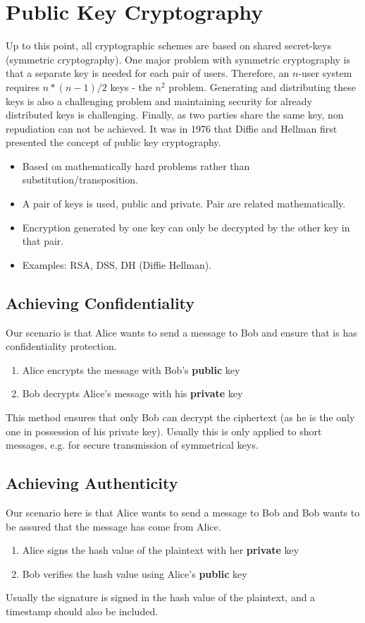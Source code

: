 \documentclass{article}
\begin{document}
\section{Public Key Cryptography}
Up to this point, all cryptographic schemes are based on shared secret-keys (symmetric cryptography). One major problem with symmetric cryptography is that a separate key is needed for each pair of users. Therefore, an $n$-user system requires $n*(n-1)/2$ keys - the $n^{2}$ problem. Generating and distributing these keys is also a challenging problem and maintaining security for already distributed keys is challenging. Finally, as two parties share the same key, non repudiation can not be achieved. It was in 1976 that Diffie and Hellman first presented the concept of public key cryptography.
\begin{itemize}
	\item Based on mathematically hard problems rather than substitution/transposition.
	\item A pair of keys is used, public and private. Pair are related mathematically.
	\item Encryption generated by one key can only be decrypted by the other key in that pair.
	\item Examples: RSA, DSS, DH (Diffie Hellman).
\end{itemize}

\subsection{Achieving Confidentiality}
Our scenario is that Alice wants to send a message to Bob and ensure that is has confidentiality protection.
\begin{enumerate}
	\item Alice encrypts the message with Bob's \textbf{public} key
	\item Bob decrypts Alice's message with his \textbf{private} key
\end{enumerate}
This method ensures that only Bob can decrypt the ciphertext (as he is the only one in possession of his private key). Usually this is only applied to short messages, e.g. for secure transmission of symmetrical keys.

\subsection{Achieving Authenticity}
Our scenario here is that Alice wants to send a message to Bob and Bob wants to be assured that the message has come from Alice.
\begin{enumerate}
	\item Alice signs the hash value of the plaintext with her \textbf{private} key
	\item Bob verifies the hash value using Alice's \textbf{public} key
\end{enumerate}
Usually the signature is signed in the hash value of the plaintext, and a timestamp should also be included.
\end{document}
